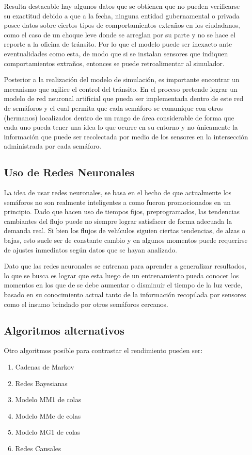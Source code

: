 \documentclass[conference]{IEEEtran}
\begin{document}
Resulta destacable hay algunos datos que se obtienen que no pueden verificarse su exactitud debido a que a la fecha, ninguna entidad gubernamental o privada posee datos sobre ciertos tipos de comportamientos extraños en los ciudadanos, como el caso de un choque leve donde se arreglan por su parte y no se hace el reporte a la oficina de tr\'ansito. Por lo que el modelo puede ser inexacto ante eventualidades como esta, de modo que si se instalan sensores que indiquen comportamientos extraños, entonces se puede retroalimentar al simulador.

Posterior a la realizaci\'{o}n del modelo de simulaci\'{o}n, es importante encontrar un mecanismo que agilice el control del tr\'ansito. En el proceso pretende lograr un modelo de red neuronal artificial que pueda ser implementada dentro de este red de sem\'{a}foros y el cual permita que cada sem\'{a}foro se comunique con otros (hermanos) localizados dentro de un rango de \'{a}rea considerable de forma que cada uno pueda tener una idea lo que ocurre en su entorno y no \'{u}nicamente la informaci\'{o}n que puede ser recolectada por medio de los sensores en la intersecci\'{o}n administrada por cada sem\'{a}foro.

\subsection{Uso de Redes Neuronales}
La idea de usar redes neuronales, se basa en el hecho de que actualmente los sem\'{a}foros no son realmente inteligentes a como fueron promocionados en un principio. Dado que hacen uso de tiempos fijos, preprogramados, las tendencias cambiantes del flujo puede no siempre lograr satisfacer de forma adecuada la demanda real. Si bien los flujos de veh\'{i}culos siguien ciertas tendencias, de alzas o bajas, esto suele ser de constante cambio y en algunos momentos puede requerirse de ajustes inmediatos seg\'{u}n datos que se hayan analizado.

Dato que las redes neuronales se entrenan para aprender a generalizar resultados, lo que se busca es lograr que esta luego de un entrenamiento pueda conocer los momentos en los que de se debe aumentar o disminuir el tiempo de la luz verde, basado en su conocimiento actual tanto de la informaci\'{o}n recopilada por sensores como el insumo brindado por otros sem\'{a}foros cercanos.

\subsection{Algoritmos alternativos}
Otro algoritmos posible para contrastar el rendimiento pueden ser:
\begin{enumerate}
\item Cadenas de Markov
\item Redes Bayesianas
\item Modelo MM1 de colas
\item Modelo MMc de colas
\item Modelo MG1 de colas
\item Redes Causales
\end{enumerate}
		
\end{document}
